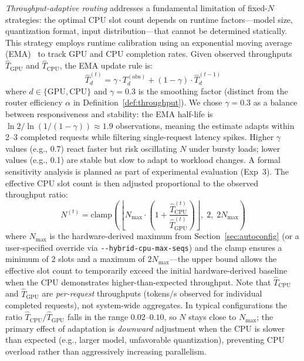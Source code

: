 \documentclass[10pt,conference]{IEEEtran}
\begin{document}
\emph{Throughput-adaptive routing} addresses a fundamental limitation of fixed-$N$ strategies: the optimal CPU slot count depends on runtime factors---model size, quantization format, input distribution---that cannot be determined statically.
This strategy employs runtime calibration using an exponential moving average (EMA)~\cite{hunter1986ema} to track GPU and CPU completion rates.
Given observed throughputs $\hat{T}_\text{GPU}$ and $\hat{T}_\text{CPU}$, the EMA update rule is:
\begin{equation}
\hat{T}_d^{(t)} = \gamma \cdot T_d^{(\text{obs})} + (1 - \gamma) \cdot \hat{T}_d^{(t-1)}
\end{equation}
where $d \in \{\text{GPU}, \text{CPU}\}$ and $\gamma = 0.3$ is the smoothing factor (distinct from the router efficiency $\alpha$ in Definition~\ref{def:throughput}).
We chose $\gamma = 0.3$ as a balance between responsiveness and stability: the EMA half-life is $\ln 2 / \ln(1/(1{-}\gamma)) \approx 1.9$ observations, meaning the estimate adapts within 2--3 completed requests while filtering single-request latency spikes.
Higher $\gamma$ values (e.g., 0.7) react faster but risk oscillating $N$ under bursty loads; lower values (e.g., 0.1) are stable but slow to adapt to workload changes.
A formal sensitivity analysis is planned as part of experimental evaluation (Exp~3).
The effective CPU slot count is then adjusted proportional to the observed throughput ratio:
\begin{equation}
N^{(t)} = \text{clamp}\!\left( \left\lfloor N_{\max} \cdot \left(1 + \frac{\hat{T}_\text{CPU}^{(t)}}{\hat{T}_\text{GPU}^{(t)}}\right) \right\rfloor,\; 2,\; 2 N_{\max} \right)
\end{equation}
where $N_{\max}$ is the hardware-derived maximum from Section~\ref{sec:autoconfig} (or a user-specified override via \texttt{-{}-hybrid-cpu-max-seqs}) and the clamp ensures a minimum of 2 slots and a maximum of $2 N_{\max}$---the upper bound allows the effective slot count to temporarily exceed the initial hardware-derived baseline when the CPU demonstrates higher-than-expected throughput.
Note that $\hat{T}_\text{CPU}$ and $\hat{T}_\text{GPU}$ are \emph{per-request} throughputs (tokens/s observed for individual completed requests), not system-wide aggregates.
In typical configurations the ratio $\hat{T}_\text{CPU}/\hat{T}_\text{GPU}$ falls in the range $0.02\text{--}0.10$, so $N$ stays close to $N_{\max}$; the primary effect of adaptation is \emph{downward} adjustment when the CPU is slower than expected (e.g., larger model, unfavorable quantization), preventing CPU overload rather than aggressively increasing parallelism.
\end{document}
